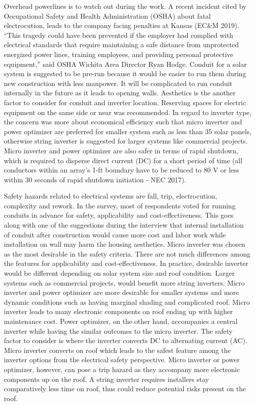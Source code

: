\documentclass[]{article}
\begin{document}
Overhead powerlines is to watch out during the work. A recent incident
cited by Occupational Safety and Health Administration (OSHA) about
fatal electrocution, leads to the company facing penalties at Kansas
(EC\&M 2019). ``This tragedy could have been prevented if the employer
had complied with electrical standards that require maintaining a safe
distance from unprotected energized power lines, training employees, and
providing personal protective equipment,'' said OSHA Wichita Area
Director Ryan Hodge. Conduit for a solar system is suggested to be
pre-run because it would be easier to run them during new construction
with less manpower. It will be complicated to run conduit internally in
the future as it leads to opening walls. Aesthetics is the another
factor to consider for conduit and inverter location. Reserving spaces
for electric equipment on the same side or near was recommended. In
regard to inverter type, the concern was more about economical
efficiency such that micro inverter and power optimizer are preferred
for smaller system such as less than 35 solar panels, otherwise string
inverter is suggested for larger systems like commercial projects. Micro
inverter and power optimizer are also safer in terms of rapid shutdown,
which is required to disperse direct current (DC) for a short period of
time (all conductors within an array's 1-ft boundary have to be reduced
to 80 V or less within 30 seconds of rapid shutdown initiation - NEC
2017).

Safety hazards related to electrical systems are fall, trip,
electrocution, complexity and rework. In the survey, most of respondents
voted for running conduits in advance for safety, applicability and
cost-effectiveness. This goes along with one of the suggestions during
the interview that internal installation of conduit after construction
would cause more cost and labor work while installation on wall may harm
the housing aesthetics. Micro inverter was chosen as the most desirable
in the safety criteria. There are not much differences among the
features for applicability and cost-effectiveness. In practice,
desirable inverter would be different depending on solar system size and
roof condition. Larger systems such as commercial projects, would
benefit more string inverters. Micro inverter and power optimizer are
more desirable for smaller systems and more dynamic conditions such as
having marginal shading and complicated roof. Micro inverter leads to
many electronic components on roof ending up with higher maintenance
cost. Power optimizer, on the other hand, accompanies a central inverter
while having the similar outcomes to the micro inverter. The safety
factor to consider is where the inverter converts DC to alternating
current (AC). Micro inverter converts on roof which leads to the safest
feature among the inverter options from the electrical safety
perspective. Micro inverter or power optimizer, however, can pose a trip
hazard as they accompany more electronic components up on the roof. A
string inverter requires installers stay comparatively less time on
roof, thus could reduce potential risks present on the roof.
\end{document}
